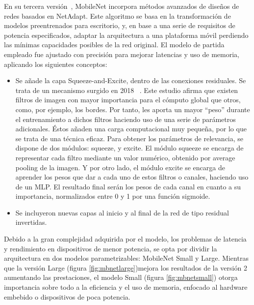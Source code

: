 En su tercera versión~\cite{howard2019searching}, MobileNet incorpora métodos avanzados de diseños de redes basados en NetAdapt. Este algoritmo se basa en la transformación de modelos preentrenados para escritorio, y, en base a una serie de requisitos de potencia especificados, adaptar la arquitectura a una plataforma móvil perdiendo las mínimas capacidades posibles de la red original.  El modelo de partida empleado fue ajustado con precisión para mejorar latencias y uso de memoria, aplicando los siguientes conceptos:

\begin{itemize}
    \item Se añade la capa Squeeze-and-Excite, dentro de las conexiones residuales. Se trata de un mecanismo surgido en 2018 ~\cite{hu2019squeezeandexcitation}. Este estudio afirma que existen filtros de imagen con mayor importancia para el cómputo global que otros, como, por ejemplo, los bordes. Por tanto, les aporta un mayor ``peso'' durante el entrenamiento a dichos filtros haciendo uso de una serie de parámetros adicionales. Éstos añaden una carga computacional muy pequeña, por lo que se trata de una técnica eficaz. Para obtener los parámetros de relevancia, se dispone de dos módulos: squeeze, y excite. El módulo squeeze se encarga de representar cada filtro mediante un valor numérico, obtenido por average pooling de la imagen. Y por otro lado, el módulo excite se encarga de aprender los pesos que dar a cada uno de estos filtros o canales, haciendo uso de un MLP. El resultado final serán los pesos de cada canal en cuanto a su importancia, normalizados entre 0 y 1 por una función sigmoide.

    \item Se incluyeron nuevas capas al inicio y al final de la red de tipo residual invertidas.
\end{itemize}


Debido a la gran complejidad adquirida por el modelo, los problemas de latencia y rendimiento en dispositivos de menor potencia, se opta por dividir la arquitectura en dos modelos parametrizables: MobileNet Small y Large. Mientras que la versión Large (figura \ref{fig:mbnetlarge})mejora los resultados de la versión 2 aumentando las prestaciones, el modelo Small (figura \ref{fig:mbnetsmall}) otorga importancia sobre todo a la eficiencia y el uso de memoria, enfocado al hardware embebido o dispositivos de poca potencia.

